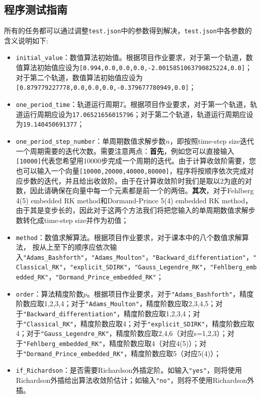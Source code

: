 \documentclass{ctexart}
\begin{document}
\begin{sloppypar}
\subsection{程序测试指南}
所有的任务都可以通过调整\verb|test.json|中的参数得到解决，\verb|test.json|中各参数的含义说明如下:
\begin{itemize}
    \item \verb|initial_value|：数值算法初始值。根据项目作业要求，对于第一个轨道，数值算法初始值应设为\verb|[0.994,0.0,0.0,0.0,-2.0015851063790825224,0.0]|；对于第二个轨道，数值算法初始值应设为\verb|[0.879779227778,0.0,0.0,0.0,-0.379677780949,0.0]|；
    \item \verb|one_period_time|：轨道运行周期$T$。根据项目作业要求，对于第一个轨道，轨道运行周期应设为\verb|17.06521656015796|；对于第二个轨道，轨道运行周期应设为\verb|19.140450691377|；
    \item \verb|one_period_step_number|：单周期数值求解步数$n$，即按照time-step size迭代一个周期需要的迭代次数。需要注意两点：\textbf{首先}，例如您可以直接输入\verb|[10000]|代表您希望用10000步完成一个周期的迭代。由于计算收敛阶需要，您也可以输入一个向量\verb|[10000,20000,40000,80000]|，程序将按顺序依次完成对应步数的迭代，并且给出收敛阶。由于在计算收敛阶时我们是取以2为底的对数，因此请确保在向量中每一个元素都是前一个的两倍。\textbf{其次}，对于Fehlberg 4(5) embedded RK method和Dormand-Prince 5(4) embedded RK method，由于其是变步长的，因此对于这两个方法我们将把您输入的单周期数值求解步数转化成time-step size并作为初值；
    \item \verb|method|：数值求解算法。根据项目作业要求，对于课本中的八个数值求解算法，
    按从上至下的顺序应依次输入\verb|"Adams_Bashforth"|，\verb|"Adams_Moulton"|，\verb|"Backward_differentiation"|，\verb|"Classical_RK"|，\verb|"explicit_SDIRK"|，\verb|"Gauss_Legendre_RK"|，\verb|"Fehlberg_embedded_RK"|，\verb|"Dormand_Prince_embedded_RK"|；
    \item \verb|order|：算法精度阶数$p$。根据项目作业要求，对于\verb|"Adams_Bashforth"|，精度阶数应取1,2,3,4；对于\verb|"Adams_Moulton"|，精度阶数应取2,3,4,5；对于\verb|"Backward_differentiation"|，精度阶数应取1,2,3,4；对于\verb|"Classical_RK"|，精度阶数应取4；对于\verb|"explicit_SDIRK"|，精度阶数应取4；对于\verb|"Gauss_Legendre_RK"|，精度阶数应取2,4,6（对应s=1,2,3）；对于\verb|"Fehlberg_embedded_RK"|，精度阶数应取4（对应4(5)）；对于\verb|"Dormand_Prince_embedded_RK"|，精度阶数应取5（对应5(4)）；
    \item \verb|if_Richardson|：是否需要Richardson外插定阶。如输入\verb|"yes"|，则将使用Richardson外插给出算法收敛阶估计；如输入\verb|"no"|，则将不使用Richardson外插。
\end{itemize}



\end{sloppypar}
\end{document}
